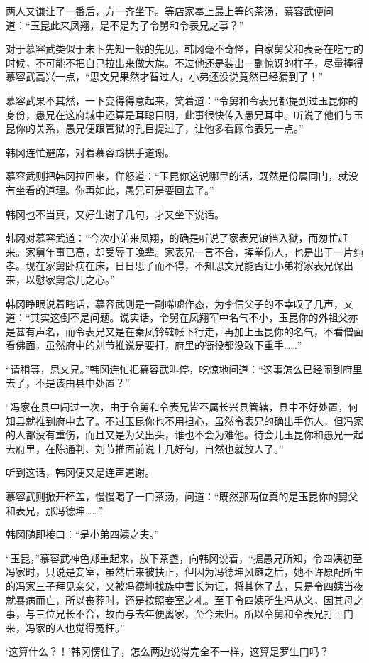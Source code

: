 两人又谦让了一番后，方一齐坐下。等店家奉上最上等的茶汤，慕容武便问道：“玉昆此来凤翔，是不是为了令舅和令表兄之事？”

对于慕容武类似于未卜先知一般的先见，韩冈毫不奇怪，自家舅父和表哥在吃亏的时候，不可能不把自己拉出来做大旗。不过他还是装出一副惊讶的样子，尽量捧得慕容武高兴一点，“思文兄果然才智过人，小弟还没说竟然已经猜到了！”

慕容武果不其然，一下变得得意起来，笑着道：“令舅和令表兄都提到过玉昆你的身份，愚兄在这府城中还算是耳聪目明，此事很快传入愚兄耳中。听说了他们与玉昆你的关系，愚兄便跟管狱的孔目提过了，让他多看顾令表兄一点。”

韩冈连忙避席，对着慕容鹉拱手道谢。

慕容武则把韩冈拉回来，佯怒道：“玉昆你这说哪里的话，既然是份属同门，就没有坐看的道理。你再如此，愚兄可是要回去了。”

韩冈也不当真，又好生谢了几句，才又坐下说话。

韩冈对慕容武道：“今次小弟来凤翔，的确是听说了家表兄锒铛入狱，而匆忙赶来。家舅年事已高，却受辱于晚辈。家表兄一言不合，挥拳伤人，也是出于一片纯孝。现在家舅卧病在床，日日思子而不得，不知思文兄能否让小弟将家表兄保出来，以慰家舅念儿之心。”

韩冈睁眼说着瞎话，慕容武则是一副唏嘘作态，为李信父子的不幸叹了几声，又道：“其实这倒不是问题。说实话，令舅在凤翔军中名气不小，玉昆你的外祖父亦是甚有声名，而令表兄又是在秦凤钤辖帐下行走，再加上玉昆你的名气，不看僧面看佛面，虽然府中的刘节推说是要打，府里的衙役都没敢下重手……”

“请稍等，思文兄。”韩冈连忙把慕容武叫停，吃惊地问道：“这事怎么已经闹到府里去了，不是该由县中处置？”

“冯家在县中闹过一次，由于令舅和令表兄皆不属长兴县管辖，县中不好处置，何知县就推到府中去了。不过玉昆你也不用担心，虽然令表兄的确出手伤人，但冯家的人都没有重伤，而且又是为父出头，谁也不会为难他。待会儿玉昆你和愚兄一起去府里，在陈通判、刘节推面前说上几好句，自然也就放人了。”

听到这话，韩冈便又是连声道谢。

慕容武则掀开杯盖，慢慢喝了一口茶汤，问道：“既然那两位真的是玉昆你的舅父和表兄，那冯德坤……”

韩冈随即接口：“是小弟四姨之夫。”

“玉昆，”慕容武神色郑重起来，放下茶盏，向韩冈说着，“据愚兄所知，令四姨初至冯家时，只说是妾室，虽然后来被扶正，但因为冯德坤风瘫之后，她不许原配所生的冯家三子拜见亲父，又被冯德坤找族中耆长为证，将其休了去，只是令四姨当夜就暴病而亡，所以丧葬时，还是按照妾室之礼。至于令四姨所生冯从义，因其母之事，与三位兄长不合，故而与去年便离家，至今未归。所以令舅和令表兄打上门来，冯家的人也觉得冤枉。”

‘这算什么？！’韩冈愣住了，怎么两边说得完全不一样，这算是罗生门吗？

